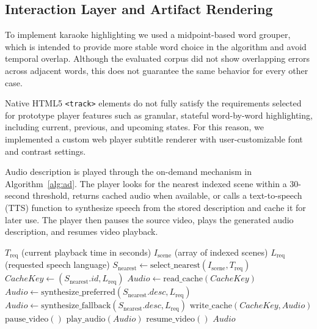 ﻿\documentclass[conference]{IEEEtran}
\begin{document}
\subsection{Interaction Layer and Artifact Rendering}
To implement karaoke highlighting we used a midpoint-based word grouper, which is intended to provide more stable word choice in the algorithm and avoid temporal overlap. Although the evaluated corpus did not show overlapping errors across adjacent words, this does not guarantee the same behavior for every other case.

Native HTML5 \texttt{<track>} elements do not fully satisfy the requirements selected for prototype player features such as granular, stateful word-by-word highlighting, including current, previous, and upcoming states. For this reason, we implemented a custom web player subtitle renderer with user-customizable font and contrast settings.

Audio description is played through the on-demand mechanism in Algorithm~\ref{alg:ad}. The player looks for the nearest indexed scene within a 30-second threshold, returns cached audio when available, or calls a text-to-speech (TTS) function to synthesize speech from the stored description and cache it for later use. The player then pauses the source video, plays the generated audio description, and resumes video playback.

\begin{algorithm}[!t]
\caption{On-Demand Audio Description Resolution}
\label{alg:ad}
\begin{algorithmic}[1]
\Require $T_{\text{req}}$ (current playback time in seconds)
\Require $I_{\text{scene}}$ (array of indexed scenes)
\Require $L_{\text{req}}$ (requested speech language)
\State $S_{\text{nearest}} \gets \text{select\_nearest}(I_{\text{scene}}, T_{\text{req}})$
    \State \Return {}
\EndIf
\State $CacheKey \gets (S_{\text{nearest}}.id, L_{\text{req}})$
    \State $Audio \gets \text{read\_cache}(CacheKey)$
\Else
        \State $Audio \gets \text{synthesize\_preferred}(S_{\text{nearest}}.desc, L_{\text{req}})$
    \Else
        \State $Audio \gets \text{synthesize\_fallback}(S_{\text{nearest}}.desc, L_{\text{req}})$
    \EndIf
    \State $\text{write\_cache}(CacheKey, Audio)$
\EndIf
\State $\text{pause\_video}()$
\State $\text{play\_audio}(Audio)$
\State $\text{resume\_video}()$
\State \Return $Audio$
\end{algorithmic}
\end{algorithm}
\end{document}
